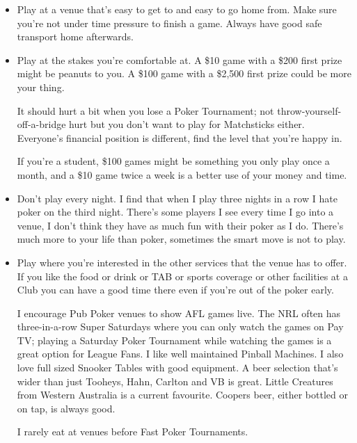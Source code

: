 \begin{itemize}

\item Play at a venue that's easy to get to and easy to go home
from. Make sure you're not under time pressure to finish a game.
Always have good safe transport home afterwards.

\item Play at the stakes you're comfortable at. A \$10 
game with a \$200 first prize might be peanuts to you. 
A \$100 game with a \$2,500 first prize could be more your thing.

It should hurt a bit when you lose a Poker Tournament; not 
throw-yourself-off-a-bridge hurt but you don't want to play for
Matchsticks either. Everyone's financial position is different,
find the level that you're happy in.

If you're a student, \$100 games might be something
you only play once a month, and a \$10 game twice a week is
a better use of your money and time.

\item Don't play every night. I find that when I play
three nights in a row I hate poker on the third
night. There's some players I see every time I go into a venue,
I don't think they have as much fun with their poker as I do.
There's much more to your life than poker, sometimes the smart
move is not to play.

\item Play where you're interested in the other services
that the venue has to offer. If you like the food or drink or
TAB or sports coverage or other facilities at a Club you can 
have a good time there even if you're out of the poker early.

I encourage Pub Poker venues to show
AFL games live. The NRL often has three-in-a-row Super Saturdays
where you can only watch the games on Pay TV; playing a Saturday
Poker Tournament while watching the games is a great option
for League Fans. I like well maintained
Pinball Machines. I also love full sized Snooker Tables with good
equipment. A beer selection that's wider than
just Tooheys, Hahn, Carlton and VB is great. Little Creatures from Western
Australia is a current favourite. Coopers beer, either bottled
or on tap, is always good.

I rarely eat at venues before Fast Poker Tournaments.



\end{itemize}
